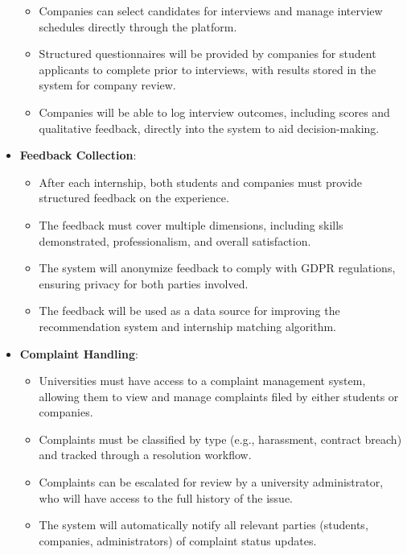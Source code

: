 \begin{itemize}
        \begin{itemize}
            \item Companies can select candidates for interviews and manage interview schedules directly through the platform.
            \item Structured questionnaires will be provided by companies for student applicants to complete prior to interviews, with results stored in the system for company review.
            \item Companies will be able to log interview outcomes, including scores and qualitative feedback, directly into the system to aid decision-making.
        \end{itemize}
    \item \textbf{Feedback Collection}: 
        \begin{itemize}
            \item After each internship, both students and companies must provide structured feedback on the experience.
            \item The feedback must cover multiple dimensions, including skills demonstrated, professionalism, and overall satisfaction.
            \item The system will anonymize feedback to comply with GDPR regulations, ensuring privacy for both parties involved.
            \item The feedback will be used as a data source for improving the recommendation system and internship matching algorithm.
        \end{itemize}
    \item \textbf{Complaint Handling}: 
        \begin{itemize}
            \item Universities must have access to a complaint management system, allowing them to view and manage complaints filed by either students or companies.
            \item Complaints must be classified by type (e.g., harassment, contract breach) and tracked through a resolution workflow.
            \item Complaints can be escalated for review by a university administrator, who will have access to the full history of the issue.
            \item The system will automatically notify all relevant parties (students, companies, administrators) of complaint status updates.
        \end{itemize}
\end{itemize}

